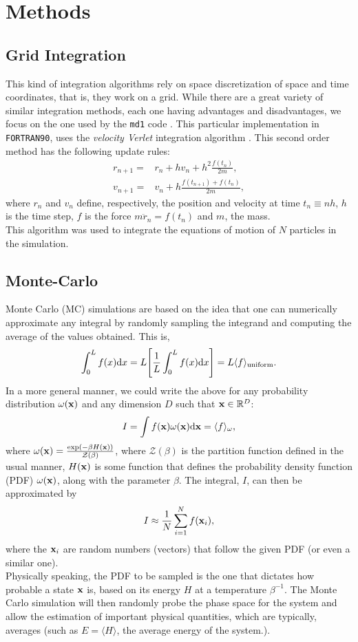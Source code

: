 \documentclass[%
aps,
pra,%
amsmath,amssymb,
preprint,%
reprint,%
notitlepage,
a4paper]{revtex4-1}
\newcommand{\md}{\texttt{md1} }
\newcommand{\average}[1]{\langle #1 \rangle}
\begin{document}
\section{Methods\label{sec:methods}}
\subsection{Grid Integration}
This kind of integration algorithms rely on space discretization of space and time coordinates, that is, they work on a grid. While there are a great variety of similar integration methods, each one having advantages and disadvantages, we focus on the one used by the \md  code \cite{Ercolessi}. This particular implementation in \texttt{FORTRAN90}, uses the \textit{velocity Verlet} integration algorithm \cite{Swope1982}. This second order method has the following update rules:
\begin{align}
r_{n+1} =& r_n + h v_n + h^2\frac{f(t_n)}{2m},\\
v_{n+1} = & v_n + h\frac{f(t_{n+1} )+ f(t_n)}{2m},
\end{align}
where $r_n$ and $v_n$ define, respectively, the position and velocity at time $t_n\equiv nh$, $h$ is the time step, $f$ is the force $m\ddot{r}_n = f(t_n)$ and $m$, the mass.\\
This algorithm was used to integrate the equations of motion of $N$ particles in the simulation.
\subsection{Monte-Carlo}
Monte Carlo (MC) simulations are based on the idea that one can numerically approximate any integral by randomly sampling the integrand and computing the average of the values obtained. This is,
\begin{equation}
\int_0^Lf(x)\dd x = L \qty[\frac{1}{L}\int_0^Lf(x)\dd x] = L \average{f}_{\mathrm{uniform}}.
\end{equation}
In a more general manner, we could write the above for any probability distribution $\omega(\vb{x})$ and any dimension $D$ such that $\vb{x} \in \mathbb{R}^D$:
\begin{equation}
I = \int f(\vb{x})\omega(\vb{x})\dd\vb{x} = \average{f}_{\omega},
\end{equation}
where $\omega(\vb{x}) = \frac{\exp(-\beta H(\vb{x}))}{\mathcal{Z}(\beta)}$, where $\mathcal{Z}(\beta)$ is the partition function defined in the usual manner, $H(\vb{x})$ is some function that defines the probability density function (PDF) $\omega(\vb{x})$, along with the parameter $\beta$. The integral, $I$, can then be approximated by 
\begin{equation}
I \approx \frac{1}{N}\sum_{i=1}^{N}f(\vb{x}_i), 
\end{equation}
where the $\vb{x}_i$ are random numbers (vectors) that follow the given PDF (or even a similar one).\\
Physically speaking, the PDF to be sampled is the one that dictates how probable a state $\vb{x}$ is, based on its energy $H$ at a temperature $\beta^{-1}$. The Monte Carlo simulation will then randomly probe the phase space for the system and allow the estimation of important physical quantities, which are typically, averages (such as $E = \average{H}$, the average energy of the system.).
\end{document}
